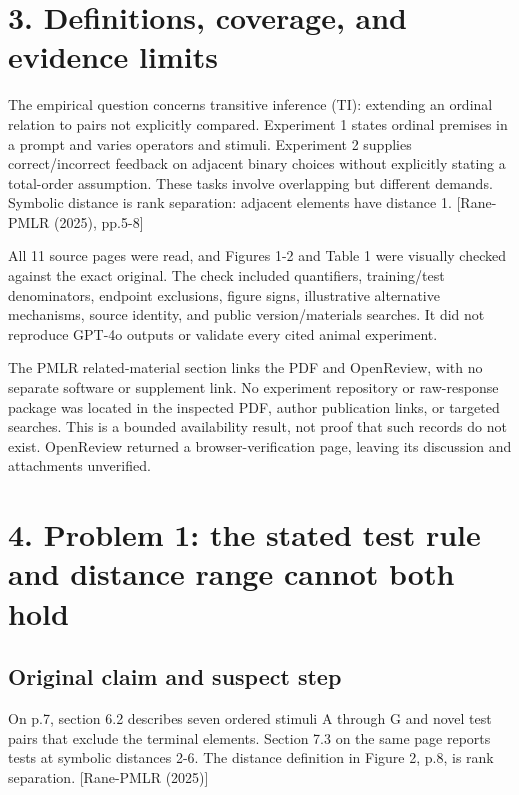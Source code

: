 \documentclass[10pt]{article}
\begin{document}
\section*{3. Definitions, coverage, and evidence limits}
The empirical question concerns transitive inference (TI): extending an ordinal relation to pairs not explicitly compared. Experiment 1 states ordinal premises in a prompt and varies operators and stimuli. Experiment 2 supplies correct/incorrect feedback on adjacent binary choices without explicitly stating a total-order assumption. These tasks involve overlapping but different demands. Symbolic distance is rank separation: adjacent elements have distance 1. [Rane-PMLR (2025), pp.5-8]\par
All 11 source pages were read, and Figures 1-2 and Table 1 were visually checked against the exact original. The check included quantifiers, training/test denominators, endpoint exclusions, figure signs, illustrative alternative mechanisms, source identity, and public version/materials searches. It did not reproduce GPT-4o outputs or validate every cited animal experiment.\par
The PMLR related-material section links the PDF and OpenReview, with no separate software or supplement link. No experiment repository or raw-response package was located in the inspected PDF, author publication links, or targeted searches. This is a bounded availability result, not proof that such records do not exist. OpenReview returned a browser-verification page, leaving its discussion and attachments unverified.\par
\section*{4. Problem 1: the stated test rule and distance range cannot both hold}
\subsection*{Original claim and suspect step}
On p.7, section 6.2 describes seven ordered stimuli A through G and novel test pairs that exclude the terminal elements. Section 7.3 on the same page reports tests at symbolic distances 2-6. The distance definition in Figure 2, p.8, is rank separation. [Rane-PMLR (2025)]\par
\end{document}

